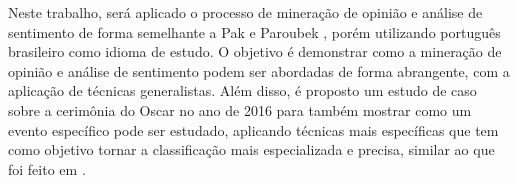 Neste trabalho, será aplicado o processo de mineração de opinião e análise de sentimento de forma semelhante a Pak e Paroubek \cite{pak2010twitter}, porém utilizando português brasileiro como idioma de estudo. O objetivo é demonstrar como a mineração de opinião e análise de sentimento podem ser abordadas de forma abrangente, com a aplicação de técnicas generalistas. Além disso, é proposto um estudo de caso sobre a cerimônia do Oscar no ano de 2016 para também mostrar como um evento específico pode ser estudado, aplicando técnicas mais específicas que tem como objetivo tornar a classificação mais especializada e precisa, similar ao que foi feito em \cite{rodrigues2012characterizing} \cite{franca2014analise} \cite{carvalho2014mineraccao} .